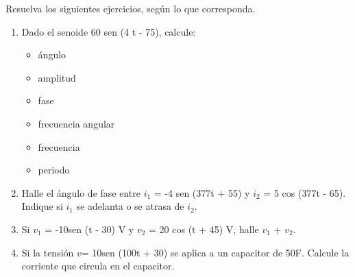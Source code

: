 \documentclass[12pt]{article}
\begin{document}
\noindent

\vspace{0.5cm}
\noindent Resuelva los siguientes ejercicios, según lo que corresponda. 
\begin{enumerate}
\item Dado el senoide 60 sen (4 \si{\pi}t - 75), calcule:
\begin{itemize} 
    \item  ángulo
    \item  amplitud
    \item  fase
    \item  frecuencia angular
    \item  frecuencia
    \item  periodo
    \end{itemize}
    
\item Halle el ángulo de fase entre $i_1$ = -4 sen (377t + 55) y  $i_2$ = 5 cos (377t - 65). Indique si $i_1$ se adelanta o se atrasa de $i_2$.

\item Si $v_1$ = -10sen (\si{\omega}t - 30) V y $v_2$ = 20 cos (\si{\omega}t + 45) V, halle $v_1$ + $v_2$.

\item Si la tensión $v$= 10sen (100t + 30) se aplica a un capacitor de 50\si{\mu}F. Calcule la corriente que circula en el capacitor.


\end{enumerate}
\end{document}

